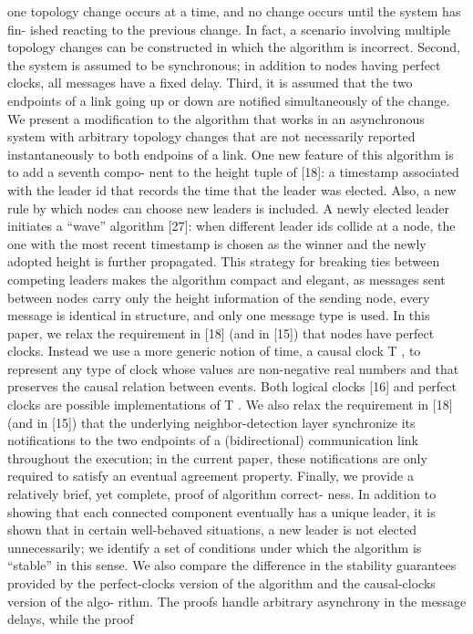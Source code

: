 one topology change occurs at a time, and no change occurs until the system has fin-
ished reacting to the previous change. In fact, a scenario involving multiple topology
changes can be constructed in which the algorithm is incorrect. Second, the system is
assumed to be synchronous; in addition to nodes having perfect clocks, all messages
have a fixed delay. Third, it is assumed that the two endpoints of a link going up or
down are notified simultaneously of the change.
We present a modification to the algorithm that works in an asynchronous system
with arbitrary topology changes that are not necessarily reported instantaneously to
both endpoins of a link. One new feature of this algorithm is to add a seventh compo-
nent to the height tuple of [18]: a timestamp associated with the leader id that records
the time that the leader was elected. Also, a new rule by which nodes can choose new
leaders is included. A newly elected leader initiates a “wave” algorithm [27]: when
different leader ids collide at a node, the one with the most recent timestamp is chosen
as the winner and the newly adopted height is further propagated. This strategy for
breaking ties between competing leaders makes the algorithm compact and elegant,
as messages sent between nodes carry only the height information of the sending
node, every message is identical in structure, and only one message type is used.
In this paper, we relax the requirement in [18] (and in [15]) that nodes have perfect
clocks. Instead we use a more generic notion of time, a causal clock T , to represent
any type of clock whose values are non-negative real numbers and that preserves
the causal relation between events. Both logical clocks [16] and perfect clocks are
possible implementations of T . We also relax the requirement in [18] (and in [15])
that the underlying neighbor-detection layer synchronize its notifications to the two
endpoints of a (bidirectional) communication link throughout the execution; in the
current paper, these notifications are only required to satisfy an eventual agreement
property.
Finally, we provide a relatively brief, yet complete, proof of algorithm correct-
ness. In addition to showing that each connected component eventually has a unique
leader, it is shown that in certain well-behaved situations, a new leader is not elected
unnecessarily; we identify a set of conditions under which the algorithm is “stable”
in this sense. We also compare the difference in the stability guarantees provided by
the perfect-clocks version of the algorithm and the causal-clocks version of the algo-
rithm. The proofs handle arbitrary asynchrony in the message delays, while the proof
